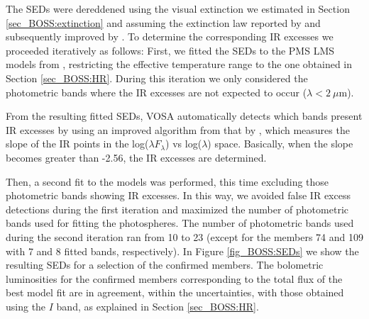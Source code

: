 \documentclass[12pt]{article}
\begin{document}
The SEDs were dereddened using the visual extinction we estimated in Section \ref{sec_BOSS:extinction} and assuming the extinction law reported by \citet{Fitzpatrick1999} and subsequently improved by \citet{Indebetouw2005}. To determine the corresponding IR excesses we proceeded iteratively as follows: First, we fitted the SEDs to the PMS LMS models from \cite{Baraffe2015}, restricting the effective temperature range to the one obtained in Section \ref{sec_BOSS:HR}. During this iteration we only considered the photometric bands where the IR excesses are not expected to occur ($\lambda < 2\ \mu$m).

From the resulting fitted SEDs, VOSA automatically detects which bands present IR excesses by using an improved algorithm from that by \citet{Lada2006}, which measures the slope of the IR points in the log($\lambda F_\lambda$) vs log($\lambda$) space. Basically, when the slope becomes greater than -2.56, the IR excesses are determined.

Then, a second fit to the \cite{Baraffe2015} models was performed, this time excluding those photometric bands showing IR excesses. In this way, we avoided false IR excess detections during the first iteration and maximized the number of photometric bands used for fitting the photospheres. The number of photometric bands used during the second iteration ran from 10 to 23 (except for the members 74 and 109 with 7 and 8 fitted bands, respectively). In Figure \ref{fig_BOSS:SEDs} we show the resulting SEDs for a selection of the confirmed members. The bolometric luminosities for the confirmed members corresponding to the total flux of the best \citet{Baraffe2015} model fit are in agreement, within the uncertainties, with those obtained using the $I$ band, as explained in Section \ref{sec_BOSS:HR}.
\end{document}

